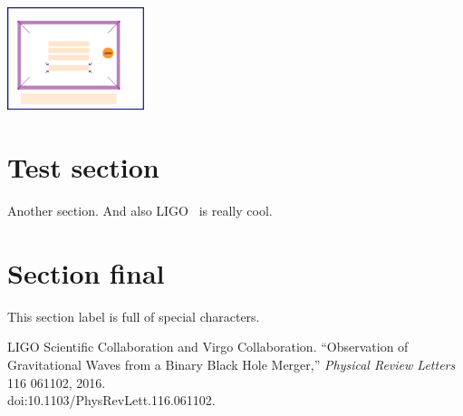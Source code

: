 \documentclass[12pt]{article}
\begin{document}
\includegraphics[width=4cm,angle=10]{anothertestgraphics}


\section{Test section}
\label{sec:testref}

Another section.  And also LIGO~\cite{Ligo2016} is really cool.

\section{Section final}
\label{sec:ref^th_sp-e:c[ial+charsz?x/xa;.=x}

This section label is full of special characters.


\begin{thebibliography}{99}
 {LIGO Scientific Collaboration and Virgo
    Collaboration.}  ``Observation of Gravitational Waves from a Binary Black
  Hole Merger,'' \emph{Physical Review Letters} {116} {061102}, {2016}.
  \\
  doi:{10.1103/PhysRevLett.116.061102}.
\end{thebibliography}
\end{document}

